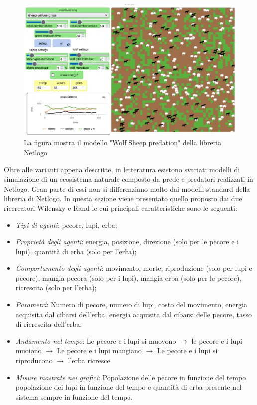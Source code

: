 \documentclass[11pt]{article}
\begin{document}
\begin{figure}[h]
    \centering
    \includegraphics[scale = 0.5]{modelloNetLogo.png}
    \caption{La figura mostra il modello "Wolf Sheep predation" della libreria Netlogo}
    \label{fig:ModelloNetlogo}
\end{figure}

Oltre alle varianti appena descritte, in letteratura esistono svariati modelli di simulazione di un ecosistema naturale composto da prede e predatori realizzati in Netlogo. Gran parte di essi non si differenziano molto dai modelli standard della libreria di Netlogo. In questa sezione viene presentato quello proposto dai due ricercatori Wilensky e Rand\cite{WilenskyRand} le cui principali caratteristiche sono le seguenti: 

\begin{itemize}
    \item \emph{Tipi di agenti}: pecore, lupi, erba;
    \item \emph{Proprietà degli agenti}: energia, posizione, direzione (solo per le pecore e i lupi), quantità di erba (solo per l'erba);
    \item \emph{Comportamento degli agenti}: movimento, morte, riproduzione (solo per lupi e pecore), mangia-pecora (solo per i lupi), mangia-erba (solo per le pecore), ricrescita (solo per l'erba);
    \item \emph{Parametri}: Numero di pecore, numero di lupi, costo del movimento, energia acquisita dal cibarsi dell'erba, energia acquisita dal cibarsi delle pecore, tasso di ricrescita dell'erba.
    \item \emph{Andamento nel tempo}: Le pecore e i lupi si muovono $\rightarrow$ le pecore e i lupi muoiono $\rightarrow$ Le pecore e i lupi mangiano $\rightarrow$ Le pecore e i lupi si riproducono $\rightarrow$ l'erba ricresce
    \item \emph{Misure mostrate nei grafici}: Popolazione delle pecore in funzione del tempo, popolazione dei lupi in funzione del tempo e quantità di erba presente nel sistema sempre in funzione del tempo. 
\end{itemize}
\end{document}
